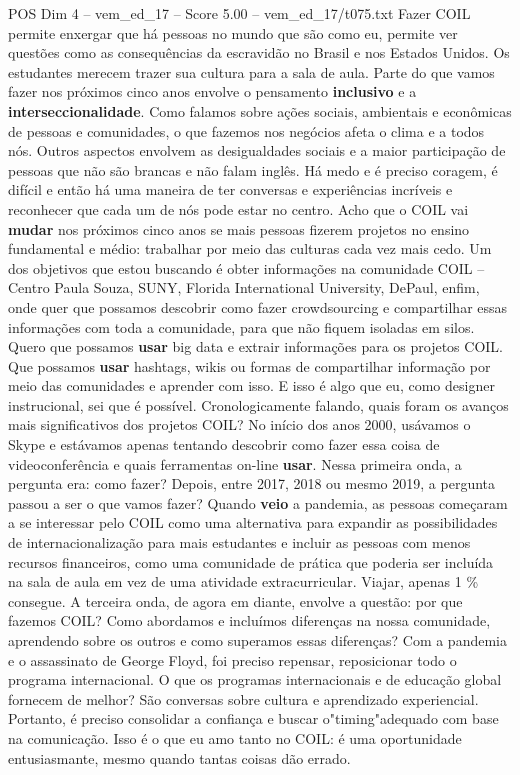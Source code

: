 \begin{textsample}{POS Dim 4 – vem\_ed\_17 – Score 5.00 – vem\_ed\_17/t075.txt}  \label{ex:f4_pos_081}
Fazer COIL permite enxergar que há pessoas no mundo que são como eu, permite ver questões como as consequências da escravidão no Brasil e nos Estados Unidos.
Os estudantes merecem trazer sua cultura para a sala de aula.
Parte do que vamos fazer nos próximos cinco anos envolve o pensamento \textbf{inclusivo} e a \textbf{interseccionalidade}.
Como falamos sobre ações sociais, ambientais e econômicas de pessoas e comunidades, o que fazemos nos negócios afeta o clima e a todos nós.
Outros aspectos envolvem as desigualdades sociais e a maior participação de pessoas que não são brancas e não falam inglês.
Há medo e é preciso coragem, é difícil e então há uma maneira de ter conversas e experiências incríveis e reconhecer que cada um de nós pode estar no centro.
Acho que o COIL vai \textbf{mudar} nos próximos cinco anos se mais pessoas fizerem projetos no ensino fundamental e médio: trabalhar por meio das culturas cada vez mais cedo.
Um dos objetivos que estou buscando é obter informações na comunidade COIL – Centro Paula Souza, SUNY, Florida International University, DePaul, enfim, onde quer que possamos descobrir como fazer crowdsourcing e compartilhar essas informações com toda a comunidade, para que não fiquem isoladas em silos.
Quero que possamos \textbf{usar} big data e extrair informações para os projetos COIL.
Que possamos \textbf{usar} hashtags, wikis ou formas de compartilhar informação por meio das comunidades e aprender com isso.
E isso é algo que eu, como designer instrucional, sei que é possível.
Cronologicamente falando, quais foram os avanços mais significativos dos projetos COIL?
No início dos anos 2000, usávamos o Skype e estávamos apenas tentando descobrir como fazer essa coisa de videoconferência e quais ferramentas on-line \textbf{usar}.
Nessa primeira onda, a pergunta era: como fazer?
Depois, entre 2017, 2018 ou mesmo 2019, a pergunta passou a ser o que vamos fazer?
Quando \textbf{veio} a pandemia, as pessoas começaram a se interessar pelo COIL como uma alternativa para expandir as possibilidades de internacionalização para mais estudantes e incluir as pessoas com menos recursos financeiros, como uma comunidade de prática que poderia ser incluída na sala de aula em vez de uma atividade extracurricular.
Viajar, apenas 1 \% consegue.
A terceira onda, de agora em diante, envolve a questão: por que fazemos COIL?
Como abordamos e incluímos diferenças na nossa comunidade, aprendendo sobre os outros e como superamos essas diferenças?
Com a pandemia e o assassinato de George Floyd, foi preciso repensar, reposicionar todo o programa internacional.
O que os programas internacionais e de educação global fornecem de melhor?
São conversas sobre cultura e aprendizado experiencial.
Portanto, é preciso consolidar a confiança e buscar o"timing"adequado com base na comunicação.
Isso é o que eu amo tanto no COIL: é uma oportunidade entusiasmante, mesmo quando tantas coisas dão errado.

\end{textsample}
